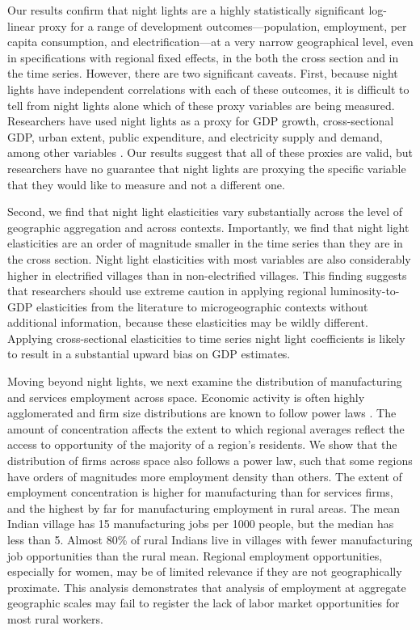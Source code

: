 \documentclass[12pt,letterpaper]{article}
\begin{document}
Our results confirm that night lights are a highly statistically
significant log-linear proxy for a range of development
outcomes---population, employment, per capita consumption, and
electrification---at a very narrow geographical level, even in
specifications with regional fixed effects, in the both the cross
section and in the time series. However, there are two significant
caveats. First, because night lights have independent correlations
with each of these outcomes, it is difficult to tell from night lights
alone which of these proxy variables are being measured. Researchers
have used night lights as a proxy for GDP growth, cross-sectional GDP,
urban extent, public expenditure, and electricity supply and demand,
among other variables
\cite{henderson2009b,baum-snow2012,bleakley2012,min2013,hodler2014,baskaran2015,burlig2016,harari2020,mahadevan2020}. Our
results suggest that all of these proxies are valid, but researchers
have no guarantee that night lights are proxying the specific variable
that they would like to measure and not a different one.

Second, we find that night light elasticities vary substantially
across the level of geographic aggregation and across
contexts. Importantly, we find that night light elasticities are an
order of magnitude smaller in the time series than they are in the
cross section. Night light elasticities with most variables are also
considerably higher in electrified villages than in non-electrified
villages. This finding suggests that researchers should use extreme
caution in applying regional luminosity-to-GDP elasticities from the
literature to microgeographic contexts without additional information,
because these elasticities may be wildly different. Applying
cross-sectional elasticities to time series night light coefficients
is likely to result in a substantial upward bias on GDP estimates.

Moving beyond night lights, we next examine the distribution of
manufacturing and services employment across space. Economic activity
is often highly agglomerated and firm size distributions are known to
follow power laws \cite{ellison1997,gabaix2016}. The amount of
concentration affects the extent to which regional averages reflect
the access to opportunity of the majority of a region's residents. We
show that the distribution of firms across space also follows a power
law, such that some regions have orders of magnitudes more employment
density than others. The extent of employment concentration is higher
for manufacturing than for services firms, and the highest by far for
manufacturing employment in rural areas. The mean Indian village has
15 manufacturing jobs per 1000 people, but the median has less than
5. Almost 80\% of rural Indians live in villages with fewer
manufacturing job opportunities than the rural mean. Regional
employment opportunities, especially for women, may be of limited
relevance if they are not geographically proximate. This analysis
demonstrates that analysis of employment at aggregate geographic
scales may fail to register the lack of labor market opportunities for
most rural workers.
\end{document}
